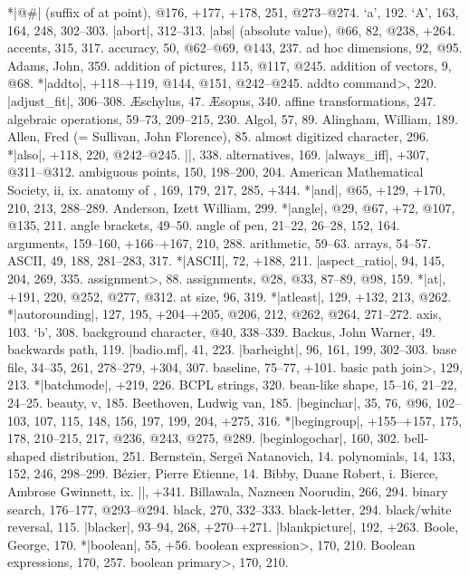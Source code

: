 *|@#| (suffix of at point), @176, +177, +178, 251, @273--@274.
\newletter
`a', 192.
`A', 163, 164, 248, 302--303.
|abort|, 312--313.
|abs| (absolute value), @66, 82, @238, +264.
accents, 315, 317.
accuracy, 50, @62--@69, @143, 237.
ad hoc dimensions, 92, @95.
Adams, John, 359.
addition of pictures, 115, @117, @245.
addition of vectors, 9, @68.
*|addto|, +118--+119, @144, @151, @242--@245.
\<addto command>, 220.
|adjust_fit|, 306--308.
{\AE}schylus, 47.
{\AE}sopus, 340.
affine transformations, 247.
algebraic operations, 59--73, 209--215, 230.
Algol, 57, 89.
Alingham, William, 189.
Allen, Fred (= Sullivan, John Florence), 85.
almost digitized character, 296.
*|also|, +118, 220, @242--@245.
|\alternation|, 338.
alternatives, 169.
|always_iff|, +307, @311--@312.
ambiguous points, 150, 198--200, 204.
American Mathematical Society, ii, ix.
anatomy of \MF, 169, 179, 217, 285, +344.
*|and|, @65, +129, +170, 210, 213, 288--289.
Anderson, Izett William, 299.
*|angle|, @29, @67, +72, @107, @135, 211.
angle brackets, 49--50.
angle of pen, 21--22, 26--28, 152, 164.
arguments, 159--160, +166--+167, 210, 288.
arithmetic, 59--63.
arrays, 54--57.
ASCII, 49, 188, 281--283, 317.
*|ASCII|, 72, +188, 211.
|aspect_ratio|, 94, 145, 204, 269, 335.
\<assignment>, 88.
assignments, @28, @33, 87--89, @98, 159.
*|at|, +191, 220, @252, @277, @312.
at size, 96, 319.
*|atleast|, 129, +132, 213, @262.
*|autorounding|, 127, 195, +204--+205, @206, 212, @262, @264, 271--272.
axis, 103.
\newletter
`b', 308.
background character, @40, 338--339.
Backus, John Warner, 49.
backwards path, 119.
|badio.mf|, 41, 223.
|barheight|, 96, 161, 199, 302--303.
base file, 34--35, 261, 278--279, +304, 307.
baseline, 75--77, +101.
\<basic path join>, 129, 213.
*|batchmode|, +219, 226.
BCPL strings, 320.
bean-like shape, 15--16, 21--22, 24--25.
beauty, v, 185.
Beethoven, Ludwig van, 185.
|beginchar|, 35, 76, @96, 102--103, 107, 115, 148, 156, 197, 199, 204,
 +275, 316.
*|begingroup|, +155--+157, 175, 178, 210--215, 217, @236, @243, @275, @289.
|beginlogochar|, 160, 302.
bell-shaped distribution, 251.
Bernste{\u\i}n, Serge{\u\i} \thinspace Natanovich, 14.
\sub polynomials, 14, 133, 152, 246, 298--299.
B\'ezier, Pierre Etienne, 14.
Bibby, Duane Robert, i.
Bierce, Ambrose Gwinnett, ix.
|\bigtest|, +341.
Billawala, Nazneen Noorudin, 266, 294.
binary search, 176--177, @293--@294.
black, 270, 332--333.
black-letter, 294.
black/white reversal, 115.
|blacker|, 93--94, 268, +270--+271.
|blankpicture|, 192, +263.
Boole, George, 170.
*|boolean|, 55, +56.
\<boolean expression>, 170, 210.
Boolean expressions, 170, 257.
\<boolean primary>, 170, 210.
